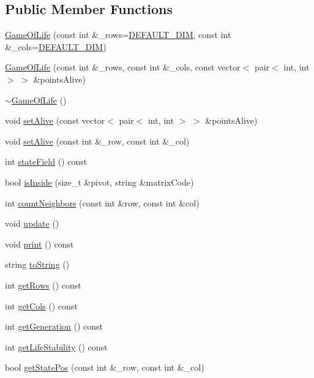 \subsection*{Public Member Functions}
\begin{DoxyCompactItemize}
\item 
\hyperlink{classGameOfLife_a1fae1dfb9d89a62909d989397f2442f6}{Game\+Of\+Life} (const int \&\+\_\+rows=\hyperlink{classGameOfLife_a15976a2df224994b6fa2ca57242fd093}{D\+E\+F\+A\+U\+L\+T\+\_\+\+D\+IM}, const int \&\+\_\+cols=\hyperlink{classGameOfLife_a15976a2df224994b6fa2ca57242fd093}{D\+E\+F\+A\+U\+L\+T\+\_\+\+D\+IM})
\item 
\hyperlink{classGameOfLife_adfc1f458a6ab273c6d1de76265dfd86d}{Game\+Of\+Life} (const int \&\+\_\+rows, const int \&\+\_\+cols, const vector$<$ pair$<$ int, int $>$ $>$ \&points\+Alive)
\item 
\hyperlink{classGameOfLife_ab06a33fee5a200e5ef62e306aaaea9c7}{$\sim$\+Game\+Of\+Life} ()
\item 
void \hyperlink{classGameOfLife_ae892f218cd9b346884d625cf5a411b32}{set\+Alive} (const vector$<$ pair$<$ int, int $>$ $>$ \&points\+Alive)
\item 
void \hyperlink{classGameOfLife_a378dac8ab3735cddf8ece3e08eef88c7}{set\+Alive} (const int \&\+\_\+row, const int \&\+\_\+col)
\item 
int \hyperlink{classGameOfLife_a509bc5ca5942b09b76d3140af10e618a}{state\+Field} () const 
\item 
bool \hyperlink{classGameOfLife_ae00b9ea2168515d8e397dcb0c46f1560}{is\+Inside} (size\+\_\+t \&pivot, string \&matrix\+Code)
\item 
int \hyperlink{classGameOfLife_a1801dc503a5106b0ec5d5336057973d6}{count\+Neighbors} (const int \&row, const int \&col)
\item 
void \hyperlink{classGameOfLife_a14f03b541c2d1a8a5f9aaa7a1e63f514}{update} ()
\item 
void \hyperlink{classGameOfLife_a1bfc6cf715659f9a9ddb737d4d87be34}{print} () const 
\item 
string \hyperlink{classGameOfLife_a962e24b89ab41c9d214102904e1bf298}{to\+String} ()
\item 
int \hyperlink{classGameOfLife_a7d069e77011b08f8ffe1075eae6d72e6}{get\+Rows} () const 
\item 
int \hyperlink{classGameOfLife_a9393672eff631609e73b8a0b5b6817d2}{get\+Cols} () const 
\item 
int \hyperlink{classGameOfLife_a327b46e378f8d678dbc1492a12058c54}{get\+Generation} () const 
\item 
int \hyperlink{classGameOfLife_a3538ce375cb68fc0f90f4c86ad52be2e}{get\+Life\+Stability} () const 
\item 
bool \hyperlink{classGameOfLife_aeda28cd2f10ad35e4284b3c48b0e5072}{get\+State\+Pos} (const int \&\+\_\+row, const int \&\+\_\+col)
\end{DoxyCompactItemize}
